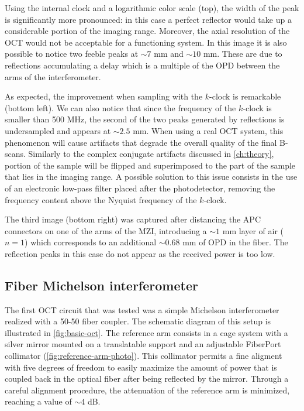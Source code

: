 Using the internal clock and a logarithmic color scale (top), the width of the peak is significantly more pronounced: in this case a perfect reflector would take up a considerable portion of the imaging range. Moreover, the axial resolution of the OCT would not be acceptable for a functioning system. In this image it is also possible to notice two feeble peaks at $\sim 7$ mm and $\sim 10$ mm. These are due to reflections accumulating a delay which is a multiple of the \ac{OPD} between the arms of the interferometer. 

As expected, the improvement when sampling with the $k$-clock is remarkable (bottom left). We can also notice that since the frequency of the $k$-clock is smaller than 500 MHz, the second of the two peaks generated by reflections is undersampled and appears at $\sim 2.5$ mm. 
When using a real OCT system, this phenomenon will cause artifacts that degrade the overall quality of the final B-scans. Similarly to the complex conjugate artifacts discussed in \autoref{ch:theory}, portion of the sample will be flipped and superimposed to the part of the sample that lies in the imaging range. A possible solution to this issue consists in the use of an electronic low-pass filter placed after the photodetector, removing the frequency content above the Nyquist frequency of the $k$-clock. 

The third image (bottom right) was captured after distancing the APC connectors on one of the arms of the \ac{MZI}, introducing a $\sim 1$ mm layer of air ($n=1$) which corresponds to an additional $\sim 0.68$ mm of \ac{OPD} in the fiber. The reflection peaks in this case do not appear as the received power is too low. 


\subsection{Fiber Michelson interferometer}

The first OCT circuit that was tested was a simple Michelson interferometer realized with a 50-50 fiber coupler. The schematic diagram of this setup is illustrated in \autoref{fig:basic-oct}. The reference arm consists in a cage system with a silver mirror mounted on a translatable support and an adjustable FiberPort collimator (\autoref{fig:reference-arm-photo}). This collimator permits a fine aligment with five degrees of freedom to easily maximize the amount of power that is coupled back in the optical fiber after being reflected by the mirror. Through a careful alignment procedure, the attenuation of the reference arm is minimized, reaching a value of $\sim 4$ dB. 


